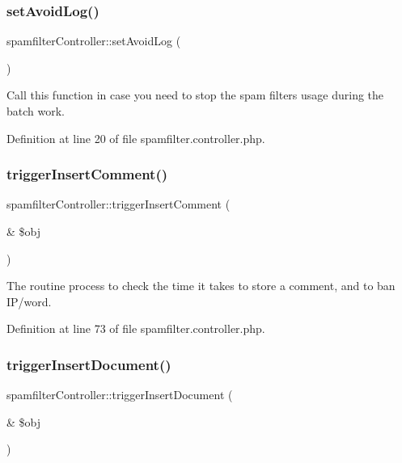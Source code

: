 \subsubsection{\texorpdfstring{set\+Avoid\+Log()}{setAvoidLog()}}
{\footnotesize\ttfamily spamfilter\+Controller\+::set\+Avoid\+Log (\begin{DoxyParamCaption}{ }\end{DoxyParamCaption})}



Call this function in case you need to stop the spam filter\textquotesingle{}s usage during the batch work. 



Definition at line 20 of file spamfilter.\+controller.\+php.

\mbox{\label{classspamfilterController_ac01aa63960909cc5c95bfae15ded5d99}} 
\subsubsection{\texorpdfstring{trigger\+Insert\+Comment()}{triggerInsertComment()}}
{\footnotesize\ttfamily spamfilter\+Controller\+::trigger\+Insert\+Comment (\begin{DoxyParamCaption}\item[{\&}]{\$obj }\end{DoxyParamCaption})}



The routine process to check the time it takes to store a comment, and to ban I\+P/word. 



Definition at line 73 of file spamfilter.\+controller.\+php.

\mbox{\label{classspamfilterController_a9ed78c37a603b06cb067ecdc523a2ae4}} 
\subsubsection{\texorpdfstring{trigger\+Insert\+Document()}{triggerInsertDocument()}}
{\footnotesize\ttfamily spamfilter\+Controller\+::trigger\+Insert\+Document (\begin{DoxyParamCaption}\item[{\&}]{\$obj }\end{DoxyParamCaption})}



